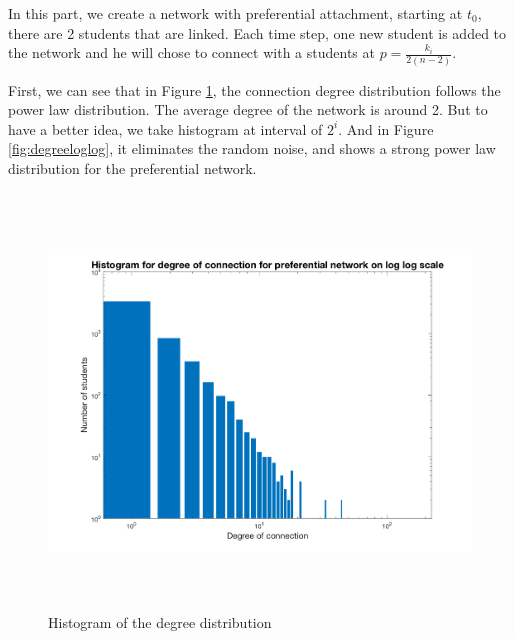 \documentclass[12pt]{article}
\begin{document}
In this part, we create a network with preferential attachment, starting at $t_{0}$, there are 2 students that are linked. Each time step, one new student is added to the network and he will chose to connect with a students at $p = \frac{k_{i}}{2(n-2)}$. 

First, we can see that in Figure \ref{fig:degreehist}, the connection degree distribution follows the power law distribution. The average degree of the network is around 2. But to have a better idea, we take histogram at interval of $2^{i}$. And in Figure \ref{fig:degreeloglog}, it eliminates the random noise, and shows a strong power law distribution for the preferential network.

\begin{figure}[H] %
\centering
\includegraphics[width = 14 cm, height = 11cm]{p_nw2.png}
\caption{Histogram of the degree distribution }
\label{fig:degreehist}
\end{figure}
\end{document}
